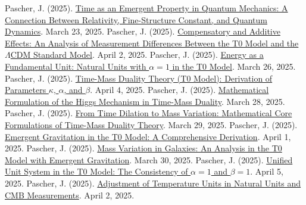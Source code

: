 \documentclass[12pt,a4paper]{article}
\begin{document}
	\begin{thebibliography}{99}
		 Pascher, J. (2025). \href{https://github.com/jpascher/T0-Time-Mass-Duality/tree/main/2/pdf/English/ZeitEmergentQMEn.pdf}{Time as an Emergent Property in Quantum Mechanics: A Connection Between Relativity, Fine-Structure Constant, and Quantum Dynamics}. March 23, 2025.
		 Pascher, J. (2025). \href{https://github.com/jpascher/T0-Time-Mass-Duality/tree/main/2/pdf/English/MessdifferenzenT0StandardEn.pdf}{Compensatory and Additive Effects: An Analysis of Measurement Differences Between the T0 Model and the \(\Lambda\)CDM Standard Model}. April 2, 2025.
		 Pascher, J. (2025). \href{https://github.com/jpascher/T0-Time-Mass-Duality/tree/main/2/pdf/English/NatEinheitenAlpha1En.pdf}{Energy as a Fundamental Unit: Natural Units with \(\alpha = 1\) in the T0 Model}. March 26, 2025.
		 Pascher, J. (2025). \href{https://github.com/jpascher/T0-Time-Mass-Duality/tree/main/2/pdf/English/ZeitMasseT0ParamsEn.pdf}{Time-Mass Duality Theory (T0 Model): Derivation of Parameters \(\kappa\), \(\alpha\), and \(\beta\)}. April 4, 2025.
		 Pascher, J. (2025). \href{https://github.com/jpascher/T0-Time-Mass-Duality/tree/main/2/pdf/English/MathHiggsZeitMasseEn.pdf}{Mathematical Formulation of the Higgs Mechanism in Time-Mass Duality}. March 28, 2025.
		 Pascher, J. (2025). \href{https://github.com/jpascher/T0-Time-Mass-Duality/tree/main/2/pdf/English/MathZeitMasseLagrangeEn.pdf}{From Time Dilation to Mass Variation: Mathematical Core Formulations of Time-Mass Duality Theory}. March 29, 2025.
		 Pascher, J. (2025). \href{https://github.com/jpascher/T0-Time-Mass-Duality/tree/main/2/pdf/English/EmergentGravT0En.pdf}{Emergent Gravitation in the T0 Model: A Comprehensive Derivation}. April 1, 2025.
		 Pascher, J. (2025). \href{https://github.com/jpascher/T0-Time-Mass-Duality/tree/main/2/pdf/English/MassVarGalaxienEn.pdf}{Mass Variation in Galaxies: An Analysis in the T0 Model with Emergent Gravitation}. March 30, 2025.
		 Pascher, J. (2025). \href{https://github.com/jpascher/T0-Time-Mass-Duality/tree/main/2/pdf/English/Alpha1Beta1KonsistenzEn.pdf}{Unified Unit System in the T0 Model: The Consistency of \(\alpha = 1\) and \(\beta = 1\)}. April 5, 2025.
		 Pascher, J. (2025). \href{https://github.com/jpascher/T0-Time-Mass-Duality/tree/main/2/pdf/English/TempEinheitenCMBEn.pdf}{Adjustment of Temperature Units in Natural Units and CMB Measurements}. April 2, 2025.

\end{thebibliography}
\end{document}
